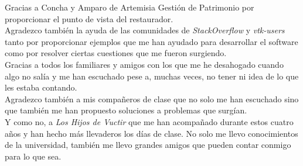 Gracias a Concha y Amparo de Artemisia Gestión de Patrimonio por proporcionar el punto de vista del restaurador.
\\

Agradezco también la ayuda de las comunidades de \textit{StackOverflow} y \textit{vtk-users} tanto por proporcionar ejemplos que me han ayudado para desarrollar el software como por resolver ciertas cuestiones que me fueron surgiendo.
\\

Gracias a todos los familiares y amigos con los que me he desahogado cuando algo no salía y me han escuchado pese a, muchas veces, no tener ni idea de lo que les estaba contando.
\\

Agradezco también a mis compañeros de clase que no solo me han escuchado sino que también me han propuesto soluciones a problemas que surgían. 
\\

Y como no, a \textit{Los Hijos de Vuctir} que me han acompañado durante estos cuatro años y han hecho más llevaderos los días de clase. No solo me llevo conocimientos de la universidad, también me llevo grandes amigos que pueden contar conmigo para lo que sea.